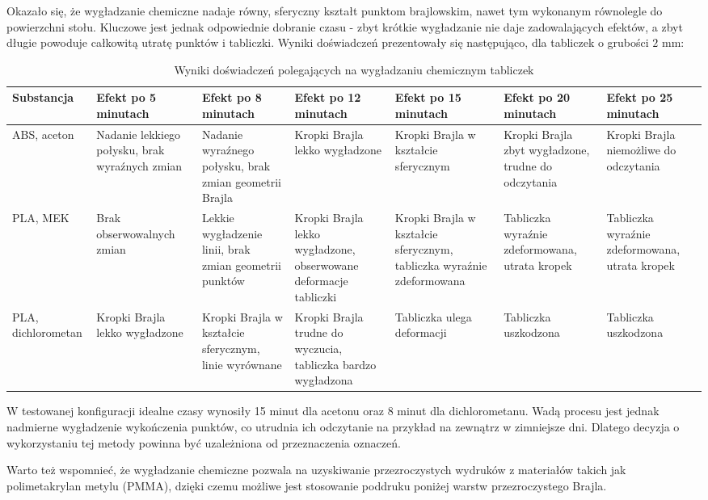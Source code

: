\documentclass[12pt,a4paper]{article}
\begin{document}
Okazało się, że wygładzanie chemiczne nadaje równy, sferyczny kształt punktom brajlowskim, nawet tym wykonanym równolegle do powierzchni stołu. Kluczowe jest jednak odpowiednie dobranie czasu - zbyt krótkie wygładzanie nie daje zadowalających efektów, a zbyt długie powoduje całkowitą utratę punktów i tabliczki.
Wyniki doświadczeń prezentowały się następująco, dla tabliczek o grubości $2 \text{ mm}$:
\begin{table}[t]
\caption{Wyniki doświadczeń polegających na wygładzaniu chemicznym tabliczek}
\begin{tabular}{|l|l|l|l|l|l|l|}
\hline
Substancja & Efekt po 5 minutach & Efekt po 8 minutach & Efekt po 12 minutach & Efekt po 15 minutach & Efekt po 20 minutach & Efekt po 25 minutach \\
\hline
ABS, aceton & Nadanie lekkiego połysku, brak wyraźnych zmian & Nadanie wyraźnego połysku, brak zmian geometrii Brajla & Kropki Brajla lekko wygładzone & Kropki Brajla w kształcie sferycznym & Kropki Brajla zbyt wygładzone, trudne do odczytania & Kropki Brajla niemożliwe do odczytania \\
\hline
PLA, MEK & Brak obserwowalnych zmian & Lekkie wygładzenie linii, brak zmian geometrii punktów & Kropki Brajla lekko wygładzone, obserwowane deformacje tabliczki & Kropki Brajla w kształcie sferycznym, tabliczka wyraźnie zdeformowana & Tabliczka wyraźnie zdeformowana, utrata kropek & Tabliczka wyraźnie zdeformowana, utrata kropek \\
\hline
PLA, dichlorometan & Kropki Brajla lekko wygładzone & Kropki Brajla w kształcie sferycznym, linie wyrównane & Kropki Brajla trudne do wyczucia, tabliczka bardzo wygładzona & Tabliczka ulega deformacji & Tabliczka uszkodzona & Tabliczka uszkodzona \\
\hline
\end{tabular} 
\end{table}

W testowanej konfiguracji idealne czasy wynosiły 15 minut dla acetonu oraz 8 minut dla dichlorometanu.
Wadą procesu jest jednak nadmierne wygładzenie wykończenia punktów, co utrudnia ich odczytanie na przykład na zewnątrz w zimniejsze dni. Dlatego decyzja o wykorzystaniu tej metody powinna być uzależniona od przeznaczenia oznaczeń.

Warto też wspomnieć, że wygładzanie chemiczne pozwala na uzyskiwanie przezroczystych wydruków z materiałów takich jak polimetakrylan metylu (PMMA), dzięki czemu możliwe jest stosowanie poddruku poniżej warstw przezroczystego Brajla.
\end{document}
